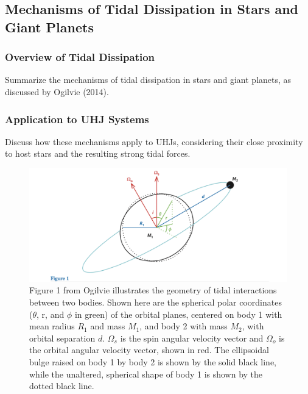 \documentclass[oneside,12pt]{amsart}
\numberwithin{page}{section}
\begin{document}
\clearpage




\subsection{Mechanisms of Tidal Dissipation in Stars and Giant Planets}\label{sec:tidaldissipation}

\subsubsection{Overview of Tidal Dissipation}
Summarize the mechanisms of tidal dissipation in stars and giant planets, as discussed by Ogilvie (2014).



\subsubsection{Application to UHJ Systems}
Discuss how these mechanisms apply to UHJs, considering their close proximity to host stars and the resulting strong tidal forces.

\begin{figure}[htbp]
    \centering
    \includegraphics[width=\linewidth]{figs/ogilvie_fig1.png}
    \caption{Figure 1 from Ogilvie illustrates the geometry of tidal interactions between two bodies. Shown here are the spherical polar coordinates ($\theta$, r, and $\phi$ in green) of the orbital planes, centered on body 1 with mean radius $R_1$ and mass $M_1$, and body 2 with mass $M_2$, with orbital separation $d$. $\Omega_s$ is the spin angular velocity vector and $\Omega_o$ is the orbital angular velocity vector, shown in red. The ellipsoidal bulge raised on body 1 by body 2 is shown by the solid black line, while the unaltered, spherical shape of body 1 is shown by the dotted black line.}
    \label{fig:ogilvie-fig1}
\end{figure}
\end{document}
